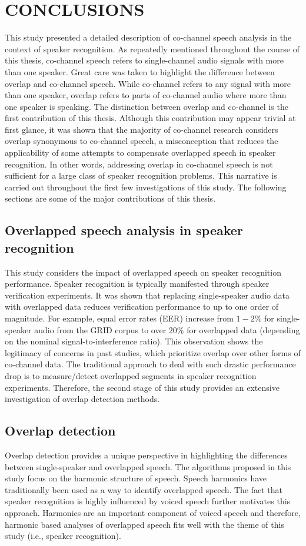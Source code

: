 \chapter{CONCLUSIONS}
\label{chapter:conclusions}
This study presented a detailed description of co-channel speech analysis in the context of speaker recognition. 
As repeatedly mentioned throughout the course of this thesis, co-channel speech refers to single-channel audio signals with more than one speaker. 
Great care was taken to highlight the difference between overlap and co-channel speech. 
While co-channel refers to any signal with more than one speaker, overlap refers to parts of co-channel audio where more than one speaker is speaking. 
The distinction between overlap and co-channel is the first contribution of this thesis. 
Although this contribution may appear trivial at first glance, it was shown that the majority of co-channel research considers overlap synonymous to co-channel speech, a misconception that reduces the applicability of some attempts to compensate overlapped speech in speaker recognition. 
In other words, addressing overlap in co-channel speech is not sufficient for a large class of speaker recognition problems. 
This narrative is carried out throughout the first few investigations of this study. 
The following sections are some of the major contributions of this thesis. 

\section{Overlapped speech analysis in speaker recognition}
This study considers the impact of overlapped speech on speaker recognition performance. 
Speaker recognition is typically manifested through speaker verification experiments. 
It was shown that replacing single-speaker audio data with overlapped data reduces verification performance to up to one order of magnitude. 
For example, equal error rates (EER) increase from $1 - 2\%$ for single-speaker audio from the GRID corpus to over $20\%$ for overlapped data (depending on the nominal signal-to-interference ratio). 
This observation shows the legitimacy of concerns in past studies, which prioritize overlap over other forms of co-channel data. 
The traditional approach to deal with such drastic performance drop is to measure/detect overlapped segments in speaker recognition experiments. 
Therefore, the second stage of this study provides an extensive investigation of overlap detection methods. 

\section{Overlap detection}
Overlap detection provides a unique perspective in highlighting the differences between single-speaker and overlapped speech. 
The algorithms proposed in this study focus on the harmonic structure of speech. 
Speech harmonics have traditionally been used as a way to identify overlapped speech. 
The fact that speaker recognition is highly influenced by voiced speech further motivates this approach. 
Harmonics are an important component of voiced speech and therefore, harmonic based analyses of overlapped speech fits well with the theme of this study (i.e., speaker recognition). 

